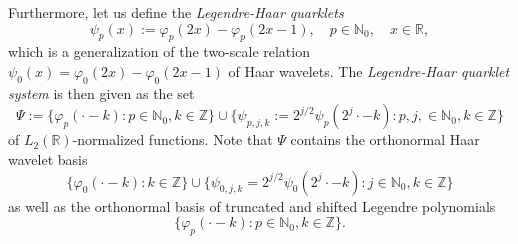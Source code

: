 \documentclass{article}
\begin{document}
Furthermore, let us define the \emph{Legendre-Haar quarklets}
\begin{equation}
  \label{eq:psip}
  \psi_p(x):=\varphi_p(2x)-\varphi_p(2x-1),\quad
  p\in\mathbb N_0,\quad x\in\mathbb R,
\end{equation}
which is a generalization of the two-scale relation $\psi_0(x)=\varphi_0(2x)-\varphi_0(2x-1)$ of Haar wavelets. The \emph{Legendre-Haar quarklet system} is then given as the set
\begin{equation}
\label{eq:Psi}
\Psi:=\big\{\varphi_p(\cdot -k):p\in\mathbb N_0,k\in\mathbb Z\big\}\cup\big\{\psi_{p,j,k}:=2^{j/2}\psi_p(2^j\cdot-k):p,j,\in\mathbb N_0,k\in\mathbb Z\big\}
\end{equation}
of $L_2(\mathbb R)$-normalized functions. Note that $\Psi$ contains the orthonormal Haar wavelet basis
\begin{equation*}
\big\{\varphi_0(\cdot -k):k\in\mathbb Z\big\}\cup\big\{\psi_{0,j,k}=2^{j/2}\psi_0(2^j\cdot-k):j\in\mathbb N_0,k\in\mathbb Z\big\}
\end{equation*}
as well as the orthonormal basis of truncated and shifted Legendre polynomials
\begin{equation*}
\big\{\varphi_p(\cdot -k):p\in\mathbb N_0,k\in\mathbb Z\big\}.
\end{equation*}
\end{document}
